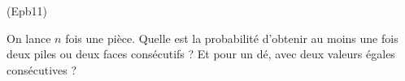 \begin{tiny}(Epb11)\end{tiny} On lance $n$ fois une pièce. Quelle est la probabilité d'obtenir au moins une fois deux piles ou deux faces consécutifs ? Et pour un dé, avec deux valeurs égales consécutives ?